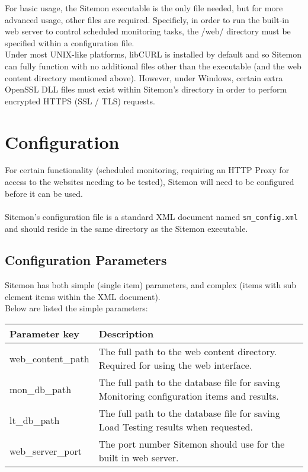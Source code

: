 \documentclass[a4paper]{article}
\begin{document}
For basic usage, the Sitemon executable is the only file needed, but for more advanced usage, other files are required. Specificly,
 in order to run the built-in web server to control scheduled monitoring tasks, the /web/ directory must be specified within a
 configuration file.\\

 Under most UNIX-like platforms, libCURL is installed by default and so Sitemon can fully function with no additional files
  other than the executable (and the web content directory mentioned above). However, under Windows, certain extra OpenSSL
  DLL files must exist within Sitemon's directory in order to perform encrypted HTTPS (SSL / TLS) requests.

\section{Configuration}

For certain functionality (scheduled monitoring, requiring an HTTP Proxy for access to the websites needing to be tested),
 Sitemon will need to be configured before it can be used.\\\\
Sitemon's configuration file is a standard XML document named {\tt sm\_config.xml} and should reside in the same directory as
 the Sitemon executable.
 
\subsection{Configuration Parameters}

Sitemon has both simple (single item) parameters, and complex (items with sub element items within the XML document).\\
Below are listed the simple parameters:\\

\begin{tabular}{ | l | l | }
\hline
  Parameter key & Description \\ \hline
  web\_content\_path & The full path to the web content directory. Required for using the web interface. \\ \hline
  mon\_db\_path & The full path to the database file for saving Monitoring configuration items and results. \\ \hline
  lt\_db\_path & The full path to the database file for saving Load Testing results when requested. \\ \hline
  web\_server\_port & The port number Sitemon should use for the built in web server. \\ \hline
\end{tabular}\\
\end{document}
